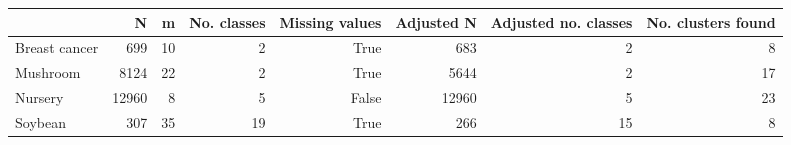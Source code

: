 \begin{tabular}{lrrrrrrr}
\toprule
{} &      N &   m &  No. classes &  Missing values &  Adjusted N &  Adjusted no. classes &  No. clusters found \\
\midrule
Breast cancer &    699 &  10 &            2 &            True &         683 &                     2 &                   8 \\
Mushroom      &   8124 &  22 &            2 &            True &        5644 &                     2 &                  17 \\
Nursery       &  12960 &   8 &            5 &           False &       12960 &                     5 &                  23 \\
Soybean       &    307 &  35 &           19 &            True &         266 &                    15 &                   8 \\
\bottomrule
\end{tabular}
